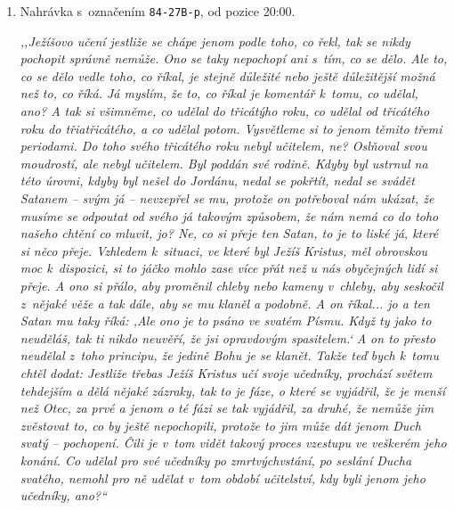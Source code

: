 
\begin{enumerate}

\item{
Nahrávka s~označením \texttt{84-27B-p}, od pozice 20:00.

\textit{%
,,Ježíšovo učení jestliže se chápe jenom podle toho, co řekl, tak se nikdy
pochopit správně nemůže. Ono se taky nepochopí ani s~tím, co se dělo.
Ale to, co se dělo vedle toho, co říkal, je stejně důležité nebo ještě důležitější
možná než to, co říká. Já myslím, že to, co říkal je komentář k~tomu, co udělal,
ano? A
tak si všimněme, co udělal do třicátýho roku, co udělal od třicátého roku do
třiatřicátého, a co udělal potom. Vysvětleme si to jenom těmito třemi
periodami. Do toho svého třicátého roku nebyl učitelem, ne? Oslňoval svou
moudrostí,
ale nebyl učitelem. Byl poddán své rodině. Kdyby byl ustrnul na této úrovni, kdyby byl
nešel do Jordánu, nedal se pokřtít, nedal se svádět Satanem -- svým já -- nevzepřel
se mu, protože on potřeboval nám ukázat, že musíme se odpoutat od svého já takovým
způsobem, že nám nemá co do toho našeho chtění co mluvit, jo? Ne, co si přeje
ten Satan, to je to liské já, které si něco přeje. Vzhledem k~situaci, ve které byl
Ježíš Kristus, měl obrovskou moc k~dispozici, si to jáčko mohlo zase více přát
než u nás obyčejných lidí si přeje. A ono si přálo, aby proměnil chleby nebo kameny
v~chleby, aby seskočil z~nějaké věže a tak dále, aby se mu klaněl a podobně. A on
říkal... jo a ten Satan mu taky říká: ,Ale ono je to psáno ve svatém Písmu. Když ty
jako to neuděláš, tak ti nikdo neuvěří, že jsi opravdovým spasitelem.` A on to přesto
neudělal z~toho principu, že jedině Bohu je se klanět. Takže teď bych k~tomu chtěl
dodat: Jestliže třebas Ježíš Kristus učí svoje učedníky, prochází světem tehdejším
a dělá nějaké zázraky, tak to je fáze, o které se vyjádřil, že je menší než
Otec, za
prvé a jenom o té fázi se tak vyjádřil, za druhé, že nemůže jim zvěstovat to,
co by ještě nepochopili, protože to jim může dát jenom Duch svatý -- pochopení. Čili
je v~tom vidět takový proces vzestupu ve veškerém jeho konání. Co udělal pro své
učedníky po zmrtvýchvstání, po seslání Ducha svatého, nemohl pro ně udělat v~tom
období učitelství, kdy byli jenom jeho učedníky, ano?{}``
}

}
\end{enumerate}
